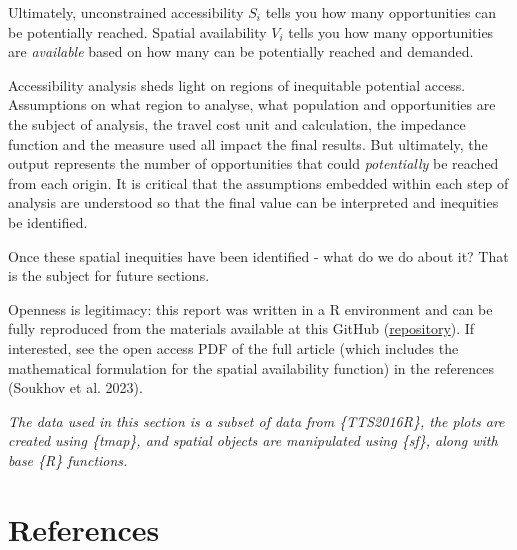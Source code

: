 \documentclass[12pt, oneside]{report}
\begin{document}
Ultimately, unconstrained accessibility \(S_i\) tells you how many
opportunities can be potentially reached. Spatial availability \(V_i\)
tells you how many opportunities are \emph{available} based on how many
can be potentially reached and demanded.

Accessibility analysis sheds light on regions of inequitable potential
access. Assumptions on what region to analyse, what population and
opportunities are the subject of analysis, the travel cost unit and
calculation, the impedance function and the measure used all impact the
final results. But ultimately, the output represents the number of
opportunities that could \emph{potentially} be reached from each origin.
It is critical that the assumptions embedded within each step of
analysis are understood so that the final value can be interpreted and
inequities be identified.

Once these spatial inequities have been identified - what do we do about
it? That is the subject for future sections.

Openness is legitimacy: this report was written in a R environment and
can be fully reproduced from the materials available at this GitHub
(\href{https://github.com/soukhova/MJ-Accessibility-Blogs}{repository}).
If interested, see the open access PDF of the full article (which
includes the mathematical formulation for the spatial availability
function) in the references (Soukhov et al. 2023).

\emph{The data used in this section is a subset of data from
\{TTS2016R\}, the plots are created using \{tmap\}, and spatial objects
are manipulated using \{sf\}, along with base \{R\} functions.}

\newpage

\hypertarget{references}{%
\section{References}\label{references}}
\end{document}
